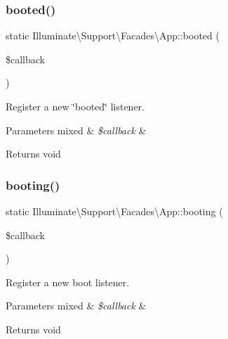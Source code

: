 \subsubsection{\texorpdfstring{booted()}{booted()}}
{\footnotesize\ttfamily static Illuminate\textbackslash{}\+Support\textbackslash{}\+Facades\textbackslash{}\+App\+::booted (\begin{DoxyParamCaption}\item[{}]{\$callback }\end{DoxyParamCaption})\hspace{0.3cm}{\ttfamily [static]}}

Register a new \char`\"{}booted\char`\"{} listener.


\begin{DoxyParams}[1]{Parameters}
mixed & {\em \$callback} & \\
\hline
\end{DoxyParams}
\begin{DoxyReturn}{Returns}
void 
\end{DoxyReturn}
\mbox{\label{class_illuminate_1_1_support_1_1_facades_1_1_app_a6e0a1ea8829091159951d60b5b5b11f3}} 
\subsubsection{\texorpdfstring{booting()}{booting()}}
{\footnotesize\ttfamily static Illuminate\textbackslash{}\+Support\textbackslash{}\+Facades\textbackslash{}\+App\+::booting (\begin{DoxyParamCaption}\item[{}]{\$callback }\end{DoxyParamCaption})\hspace{0.3cm}{\ttfamily [static]}}

Register a new boot listener.


\begin{DoxyParams}[1]{Parameters}
mixed & {\em \$callback} & \\
\hline
\end{DoxyParams}
\begin{DoxyReturn}{Returns}
void 
\end{DoxyReturn}
\mbox{\label{class_illuminate_1_1_support_1_1_facades_1_1_app_a64bbb4c2fa9f4b9f064e1d30fe9633d2}} 
